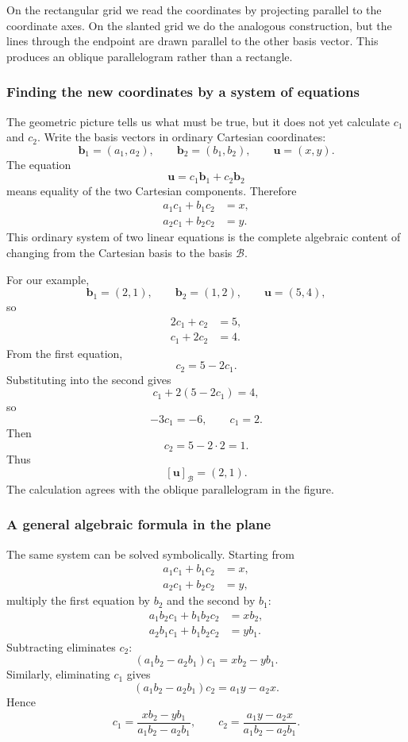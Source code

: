 On the rectangular grid we read the coordinates by projecting parallel to the
coordinate axes. On the slanted grid we do the analogous construction, but the
lines through the endpoint are drawn parallel to the other basis vector. This
produces an oblique parallelogram rather than a rectangle.

\subsubsection*{Finding the new coordinates by a system of equations}

The geometric picture tells us what must be true, but it does not yet calculate
$c_1$ and $c_2$. Write the basis vectors in ordinary Cartesian coordinates:
\[
\mathbf b_1=(a_1,a_2),
\qquad
\mathbf b_2=(b_1,b_2),
\qquad
\mathbf u=(x,y).
\]
The equation
\[
\mathbf u=c_1\mathbf b_1+c_2\mathbf b_2
\]
means equality of the two Cartesian components. Therefore
\[
\boxed{
\begin{aligned}
 a_1c_1+b_1c_2&=x,\\
 a_2c_1+b_2c_2&=y.
\end{aligned}}
\]
This ordinary system of two linear equations is the complete algebraic content
of changing from the Cartesian basis to the basis $\mathcal B$.

For our example,
\[
\mathbf b_1=(2,1),
\qquad
\mathbf b_2=(1,2),
\qquad
\mathbf u=(5,4),
\]
so
\[
\begin{aligned}
2c_1+c_2&=5,\\
c_1+2c_2&=4.
\end{aligned}
\]
From the first equation,
\[
c_2=5-2c_1.
\]
Substituting into the second gives
\[
c_1+2(5-2c_1)=4,
\]
so
\[
-3c_1=-6,
\qquad
c_1=2.
\]
Then
\[
c_2=5-2\cdot2=1.
\]
Thus
\[
\boxed{[\mathbf u]_{\mathcal B}=(2,1)}.
\]
The calculation agrees with the oblique parallelogram in the figure.

\subsubsection*{A general algebraic formula in the plane}

The same system can be solved symbolically. Starting from
\[
\begin{aligned}
 a_1c_1+b_1c_2&=x,\\
 a_2c_1+b_2c_2&=y,
\end{aligned}
\]
multiply the first equation by $b_2$ and the second by $b_1$:
\[
\begin{aligned}
 a_1b_2c_1+b_1b_2c_2&=xb_2,\\
 a_2b_1c_1+b_1b_2c_2&=yb_1.
\end{aligned}
\]
Subtracting eliminates $c_2$:
\[
(a_1b_2-a_2b_1)c_1=xb_2-yb_1.
\]
Similarly, eliminating $c_1$ gives
\[
(a_1b_2-a_2b_1)c_2=a_1y-a_2x.
\]
Hence
\[
\boxed{
 c_1=\frac{xb_2-yb_1}{a_1b_2-a_2b_1},
 \qquad
 c_2=\frac{a_1y-a_2x}{a_1b_2-a_2b_1}
}.
\]

